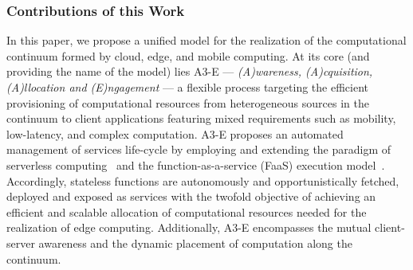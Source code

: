%


\subsubsection*{Contributions of this Work}


In this paper, we propose a unified model for the realization of the computational continuum formed by cloud, edge, and mobile computing. At its core (and providing the name of the model) lies A3-E --- \textit{(A)wareness, (A)cquisition, (A)llocation and (E)ngagement} --- a flexible process targeting the efficient provisioning of computational resources from heterogeneous sources in the continuum to client applications featuring mixed requirements such as mobility, low-latency, and complex computation. 
A3-E proposes an automated management of services life-cycle by employing and extending the paradigm of serverless computing~\cite{Hendrickson:2016,baldini2017serverless,GarrigaMendonca2017} and the function-as-a-service (FaaS) execution model~\cite{MateosFaaster17}. Accordingly, stateless functions are autonomously and opportunistically fetched, deployed and exposed as services with the twofold objective of achieving an efficient and scalable allocation of computational resources needed for the realization of edge computing. Additionally, A3-E encompasses the mutual client-server awareness and the dynamic placement of computation along the continuum.


